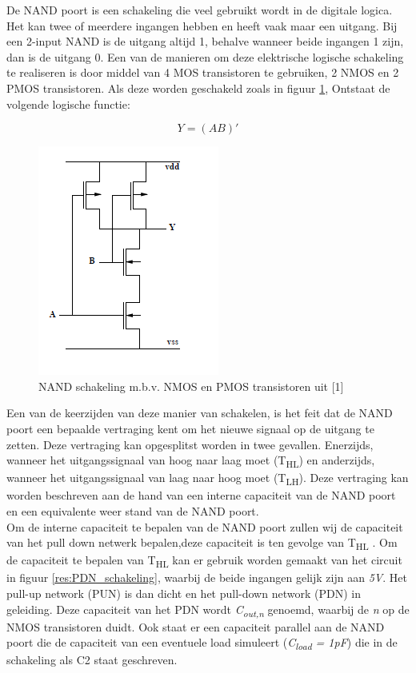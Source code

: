 \documentclass{article}
\begin{document}
\newcommand{\tss}{\textsubscript}

De NAND poort is een schakeling die veel gebruikt wordt in de digitale logica. Het kan twee of meerdere ingangen hebben en heeft vaak maar een uitgang. Bij een 2-input NAND is de uitgang altijd 1, behalve wanneer beide ingangen 1 zijn, dan is de uitgang 0. Een van de manieren om deze elektrische logische schakeling te realiseren is door middel van 4 MOS transistoren te gebruiken, 2 NMOS en 2 PMOS transistoren. Als deze worden geschakeld zoals in figuur \ref{res:NAND_schakeling}, Ontstaat de volgende logische functie: 

\begin{equation}
Y = (AB)'
\end{equation}

 \begin{figure} [h!]
 \begin{center}
 \includegraphics [scale = 1] {figures/NAND}
 \caption{NAND schakeling m.b.v. NMOS en PMOS transistoren uit [1]}
 \label{res:NAND_schakeling}
 \end{center}
 \end{figure}

Een van de keerzijden van deze manier van schakelen, is het feit dat de NAND poort een bepaalde vertraging kent om het nieuwe signaal op de uitgang te zetten. Deze vertraging kan opgesplitst worden in twee gevallen. Enerzijds, wanneer het uitgangssignaal van hoog naar laag moet (T\tss{HL}) en anderzijds, wanneer het uitgangssignaal van laag naar hoog moet (T\tss{LH}). Deze vertraging kan worden beschreven aan de hand van een interne capaciteit van de NAND poort en een equivalente weer stand van de NAND poort.\\

Om de interne capaciteit te bepalen van de NAND poort zullen wij de capaciteit van het pull down netwerk bepalen,deze capaciteit is ten gevolge van T\tss{HL} . Om de capaciteit te bepalen van T\tss{HL} kan er gebruik worden gemaakt van het  circuit in figuur \ref{res:PDN_schakeling}, waarbij de beide ingangen gelijk zijn aan \emph{5V}. Het pull-up network (PUN) is dan dicht en het pull-down network (PDN) in geleiding. Deze capaciteit van het PDN wordt \emph{C\tss{out,n}} genoemd, waarbij de \emph{n} op de NMOS transistoren duidt. Ook staat er een capaciteit parallel aan de NAND poort die de capaciteit van een eventuele load simuleert (\emph{C\tss{load} = 1pF}) die in de schakeling als C2 staat geschreven.
\end{document}
